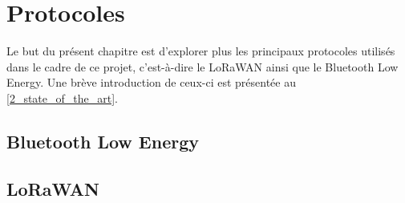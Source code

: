 \chapter{Protocoles}

Le but du présent chapitre est d'explorer plus les principaux protocoles utilisés dans le cadre de ce projet, c'est-à-dire le LoRaWAN ainsi que le Bluetooth Low Energy. Une brève introduction de ceux-ci est présentée au \cref{2_state_of_the_art}.

\section{Bluetooth Low Energy}
\label{sec-protocols_ble}




\section{LoRaWAN}
\label{sec-protocols_lorawan}



